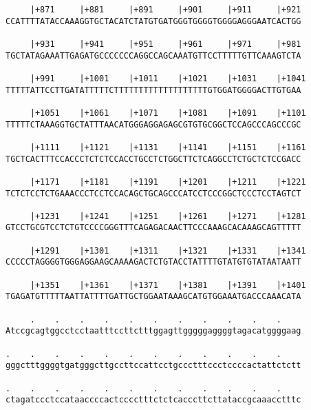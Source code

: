 \documentclass{article}
\begin{document}
\begin{Verbatim}
     |+871     |+881     |+891     |+901     |+911     |+921
CCATTTTATACCAAAGGTGCTACATCTATGTGATGGGTGGGGTGGGGAGGGAATCACTGG
                                                            
     |+931     |+941     |+951     |+961     |+971     |+981
TGCTATAGAAATTGAGATGCCCCCCCAGGCCAGCAAATGTTCCTTTTTGTTCAAAGTCTA
                                                            
     |+991     |+1001    |+1011    |+1021    |+1031    |+1041
TTTTTATTCCTTGATATTTTTCTTTTTTTTTTTTTTTTTTTGTGGATGGGGACTTGTGAA
                                                            
     |+1051    |+1061    |+1071    |+1081    |+1091    |+1101
TTTTTCTAAAGGTGCTATTTAACATGGGAGGAGAGCGTGTGCGGCTCCAGCCCAGCCCGC
                                                            
     |+1111    |+1121    |+1131    |+1141    |+1151    |+1161
TGCTCACTTTCCACCCTCTCTCCACCTGCCTCTGGCTTCTCAGGCCTCTGCTCTCCGACC
                                                            
     |+1171    |+1181    |+1191    |+1201    |+1211    |+1221
TCTCTCCTCTGAAACCCTCCTCCACAGCTGCAGCCCATCCTCCCGGCTCCCTCCTAGTCT
                                                            
     |+1231    |+1241    |+1251    |+1261    |+1271    |+1281
GTCCTGCGTCCTCTGTCCCCGGGTTTCAGAGACAACTTCCCAAAGCACAAAGCAGTTTTT
                                                            
     |+1291    |+1301    |+1311    |+1321    |+1331    |+1341
CCCCCTAGGGGTGGGAGGAAGCAAAAGACTCTGTACCTATTTTGTATGTGTATAATAATT
                                                            
     |+1351    |+1361    |+1371    |+1381    |+1391    |+1401
TGAGATGTTTTTAATTATTTTGATTGCTGGAATAAAGCATGTGGAAATGACCCAAACATA
                                                            
     .    .    .    .    .    .    .    .    .    .    .    
Atccgcagtggcctcctaatttccttctttggagttgggggaggggtagacatggggaag
                                                            
.    .    .    .    .    .    .    .    .    .    .    .    
gggctttggggtgatgggcttgccttccattcctgccctttccctccccactattctctt
                                                            
.    .    .    .    .    .    .    .    .    .    .    .    
ctagatccctccataaccccactcccctttctctcacccttcttataccgcaaacctttc
                                                            

\end{Verbatim}
\end{document}
